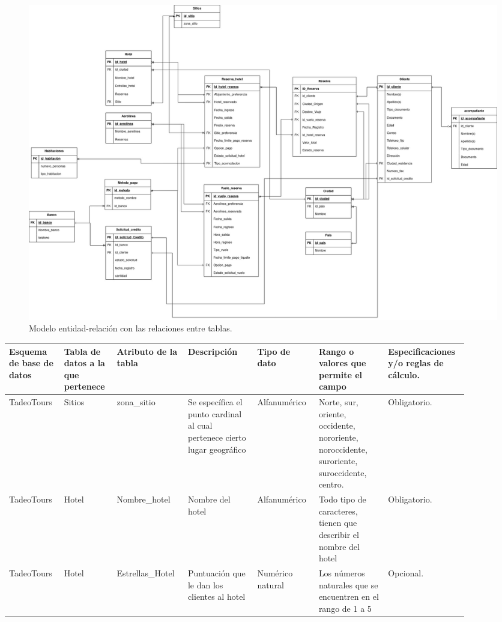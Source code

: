 \documentclass{article}
\begin{document}
\begin{landscape}
\begin{figure}[H]
    \centering
    \includegraphics[width=1\linewidth]{img/ModeloEntidadRelacion.jpg}
    \caption{Modelo entidad-relación con las relaciones entre tablas.}
    \label{fig:EntidadRelacion}
\end{figure}

\newpage


\begin{longtable}{|C{0.102\linewidth}|C{0.102\linewidth}|C{0.142\linewidth}|C{0.142\linewidth}|C{0.122\linewidth}|C{0.142\linewidth}|C{0.142\linewidth}|}
\hline
\textbf{Esquema de base de datos} & \textbf{Tabla de datos a la que pertenece} & \textbf{Atributo de la tabla} & \textbf{Descripción} & \textbf{Tipo de dato} & \textbf{Rango o valores que permite el campo} & \textbf{Especificaciones y/o reglas de cálculo.} \\ \hline

TadeoTours & Sitios & zona\_sitio & Se específica el punto cardinal al cual pertenece cierto lugar geográfico & Alfanumérico & Norte, sur, oriente, occidente, nororiente, noroccidente, suroriente, suroccidente, centro. & Obligatorio. \\ \hline

TadeoTours & Hotel & Nombre\_hotel & Nombre del hotel & Alfanumérico & Todo tipo de caracteres, tienen que describir el nombre del hotel & Obligatorio. \\ \hline

TadeoTours & Hotel & Estrellas\_Hotel & Puntuación que le dan los clientes al hotel & Numérico natural & Los números naturales que se encuentren en el rango de 1 a 5 & Opcional. \\ \hline


\end{longtable}
\end{landscape}
\end{document}
